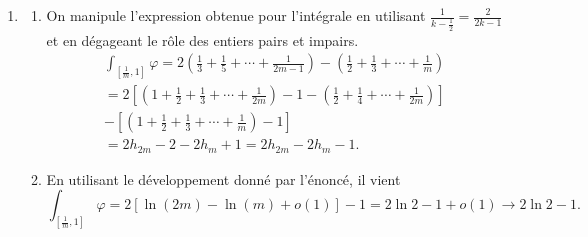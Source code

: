 \begin{enumerate}
\item
\begin{enumerate}
 \item On manipule l'expression obtenue pour l'intégrale en utilisant $\frac{1}{k-\frac{1}{2}}=\frac{2}{2k-1}$ et en dégageant le rôle des entiers pairs et impairs.
\begin{multline*}
\int_{[\frac{1}{m},1]}\varphi 
= 2\left(\frac{1}{3}+\frac{1}{5}+\cdots+\frac{1}{2m-1} \right) -\left(\frac{1}{2}+\frac{1}{3}+\cdots+\frac{1}{m} \right)\\
= 2\left[\left(1+\frac{1}{2}+\frac{1}{3}+\cdots+\frac{1}{2m}\right)-1 
         -\left(\frac{1}{2}+\frac{1}{4}+\cdots+\frac{1}{2m}\right)\right] \\
  - \left[\left(1+\frac{1}{2}+\frac{1}{3}+\cdots+\frac{1}{m}\right)-1 \right]\\
=2h_{2m}-2-2h_m+1 = 2h_{2m}-2h_m-1 .
\end{multline*}

 \item En utilisant le développement donné par l'énoncé, il vient
\begin{displaymath}
\int_{[\frac{1}{m},1]}\varphi =2\left[\ln(2m)-\ln(m)+o(1) \right]-1
=2\ln2 -1 +o(1)\rightarrow 2\ln2 -1 .
\end{displaymath}
\end{enumerate}
\end{enumerate}

